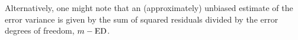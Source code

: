\documentclass[12pt]{article}
\newcommand{\ms}{\scriptscriptstyle}
\theoremstyle{definition}
\begin{document}
Alternatively, one might note that an (approximately) unbiased estimate of the error variance is given by the sum of squared residuals divided by the error degrees of freedom, $m-\textup{ED}$.






% 
%
%
%
% 

%
% 
%
%
% 
%
%
\end{document}
